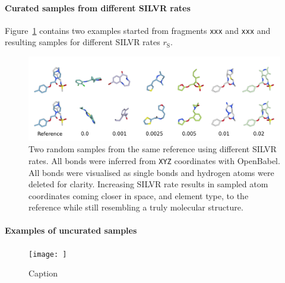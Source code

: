 \documentclass[journal=jacsat,manuscript=article]{achemso}
\begin{document}
\begin{suppinfo}
\paragraph{Curated samples from different SILVR rates}
Figure~\ref{fig:fig_2} contains two examples started from fragments \texttt{xxx} and \texttt{xxx} and resulting samples for different SILVR rates $r_{\mathrm{S}}$.
\begin{figure}[hb!]
    \centering
    \includegraphics[width=\textwidth]{paper/Figures/FigS2/fig_2_sample_vs_rate.png}
    \caption{Two random samples from the same reference using different SILVR rates. All bonds were inferred from \texttt{XYZ} coordinates with OpenBabel. All bonds were visualised as single bonds and hydrogen atoms were deleted for clarity. Increasing SILVR rate results in sampled atom coordinates coming closer in space, and element type, to the reference while still resembling a truly molecular structure.}
    \label{fig:fig_2}
\end{figure}
\nemapge

\paragraph{Examples of uncurated samples}

\begin{figure}
    \centering
    \texttt{[image: ]}
    \caption{Caption}
    \label{fig:my_label}
\end{figure}

\end{suppinfo}
\end{document}
